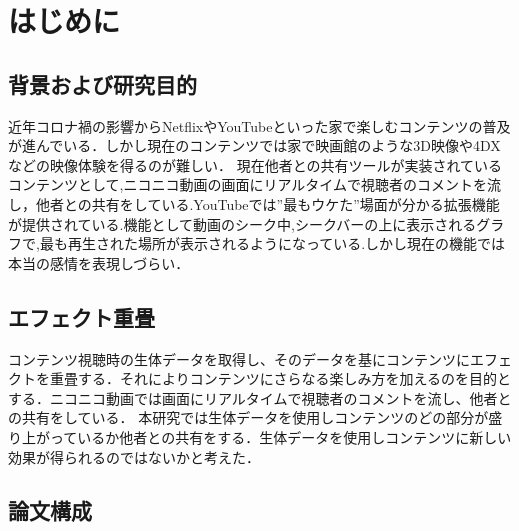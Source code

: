 \chapter{はじめに}
\thispagestyle{myheadings}

\section{背景および研究目的}
近年コロナ禍の影響からNetflixやYouTubeといった家で楽しむコンテンツの普及が進んでいる．しかし現在のコンテンツでは家で映画館のような3D映像や4DXなどの映像体験を得るのが難しい．
現在他者との共有ツールが実装されているコンテンツとして,ニコニコ動画の画面にリアルタイムで視聴者のコメントを流し，他者との共有をしている.YouTubeでは”最もウケた”場面が分かる拡張機能が提供されている.機能として動画のシーク中,シークバーの上に表示されるグラフで,最も再生された場所が表示されるようになっている.しかし現在の機能では本当の感情を表現しづらい．



\section{エフェクト重畳}
コンテンツ視聴時の生体データを取得し、そのデータを基にコンテンツにエフェクトを重畳する．それによりコンテンツにさらなる楽しみ方を加えるのを目的とする．ニコニコ動画では画面にリアルタイムで視聴者のコメントを流し、他者との共有をしている．
本研究では生体データを使用しコンテンツのどの部分が盛り上がっているか他者との共有をする．生体データを使用しコンテンツに新しい効果が得られるのではないかと考えた．
\label{sec:example}


\section{論文構成}
